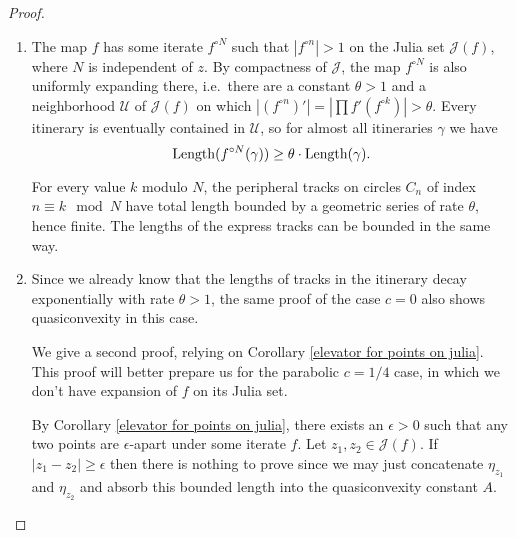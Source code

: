 \begin{proof}
	\begin{enumerate}[label=(\roman*)]
\item The map $f$ has some iterate $f^{\circ N}$ such that $|f^{\circ n}|>1$ on the Julia set $\mathcal{J}(f)$, where $N$ is independent of $z$.
By compactness of $\mathcal J$, the map $f^{\circ N}$ is also uniformly expanding there, i.e.\ there are a constant $\theta>1$ and a neighborhood $\mathcal{U}$ of $\mathcal{J}(f)$ on which $\left|(f^{\circ n})'\right|=|\prod f'(f^{\circ k}) |>\theta$. 
Every itinerary is eventually contained in $\mathcal{U}$, so for almost all itineraries $\gamma$ we have 
\begin{equation*}
\operatorname{Length} ( f^{\circ N}(\gamma) ) \geq \theta \cdot \operatorname{Length}( \gamma). 
\end{equation*}

For every value $k$ modulo $N$, the peripheral tracks on circles $C_n$ of index $n \equiv k \mod N$ have total length bounded by a geometric series of rate $\theta$, hence finite. 
The lengths of the express tracks can be bounded in the same way. %

\item Since we already know that the lengths of tracks in the itinerary decay exponentially with rate $\theta>1$, the same proof of the case $c=0$ also shows quasiconvexity in this case.

We give a second proof, relying on Corollary \ref{elevator for points on julia}. This proof will better prepare us for the
parabolic $c=1/4$ case, in which we don't have expansion of $f$ on its Julia set.

By Corollary \ref{elevator for points on julia}, there exists an $\epsilon>0$ such that any two points are $\epsilon$-apart under some iterate $f$. 
Let $z_{1},z_{2}\in\mathcal{J}(f)$. If $\left|z_{1}-z_{2}\right|\geq\epsilon$ then there is nothing to
prove since we may just concatenate $\eta_{z_{1}}$ and $\eta_{z_{2}}$
and absorb this bounded length into the quasiconvexity constant
$A$. 
\begin{comment}
Explicitly, if $\Length\left(\eta_{z}\right)\leq L$
for all $z\in\mathcal{J}$ then we take $A\geq\frac{2L}{\epsilon}$
and then automatically $\Length\left(\eta_{z_{1}}+\eta_{z_{2}}\right)\leq A\left|z_{1}-z_{2}\right|$.
\end{comment}


\end{enumerate}
\end{proof}
